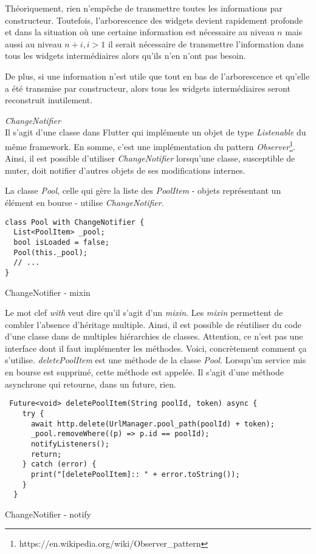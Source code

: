 Théoriquement, rien n'empêche de transmettre toutes les informations par constructeur. Toutefois, l'arborescence des widgets devient rapidement profonde
et dans la situation où une certaine information est nécessaire au niveau \(n\) mais aussi au niveau \(n+i, i > 1\) il serait nécessaire de transmettre l'information
dans tous les widgets intermédiaires alors qu'ils n'en n'ont pas besoin.

De plus, si une information n'est utile que tout en bas de l'arborescence et qu'elle a été transmise par constructeur, alors tous les widgets intermédiaires seront reconstruit inutilement.

\emph{ChangeNotifier}\\
Il s'agit d'une classe dans Flutter qui implémente un objet de type \textit{Listenable} du même framework. En somme, c'est une implémentation du pattern \textit{Observer}\footnote{https://en.wikipedia.org/wiki/Observer\_pattern}. Ainsi, il est possible d'utiliser \textit{ChangeNotifier} lorsqu'une classe, susceptible de muter, doit notifier d'autres objets de ses modifications internes. 

La classe \textit{Pool}, celle qui gère la liste des \textit{PoolItem} - objets représentant un élément en bourse - utilise \textit{ChangeNotifier}.
\begin{listing}[!h]
    \begin{verbatim}
class Pool with ChangeNotifier {
  List<PoolItem> _pool;
  bool isLoaded = false;
  Pool(this._pool);
  // ...
}
\end{verbatim}
\caption{ChangeNotifier - mixin}
\label{code:changeNotifier}
\end{listing}

Le mot clef \textit{with} veut dire qu'il s'agit d'un \textit{mixin}. Les \textit{mixin} permettent de combler l'absence d'héritage multiple. Ainsi, il est possible de réutiliser du code d'une classe dans de multiples hiérarchies de classes. Attention, ce n'est pas une interface dont il faut implémenter les méthodes.
\newpage
Voici, concrètement comment ça s'utilise. \textit{deletePoolItem} est une méthode de la classe \textit{Pool}. Lorsqu'un service mis en bourse est supprimé, cette méthode est appelée. Il s'agit d'une méthode asynchrone qui retourne, dans un future, rien.

\begin{listing}[!h]
\begin{verbatim}
 Future<void> deletePoolItem(String poolId, token) async {
    try {
      await http.delete(UrlManager.pool_path(poolId) + token);
      _pool.removeWhere((p) => p.id == poolId);
      notifyListeners();
      return;
    } catch (error) {
      print("[deletePoolItem]:: " + error.toString());
    }
  }
\end{verbatim}
\caption{ChangeNotifier - notify}
\label{code:changeNotifierNotify}
\end{listing}

